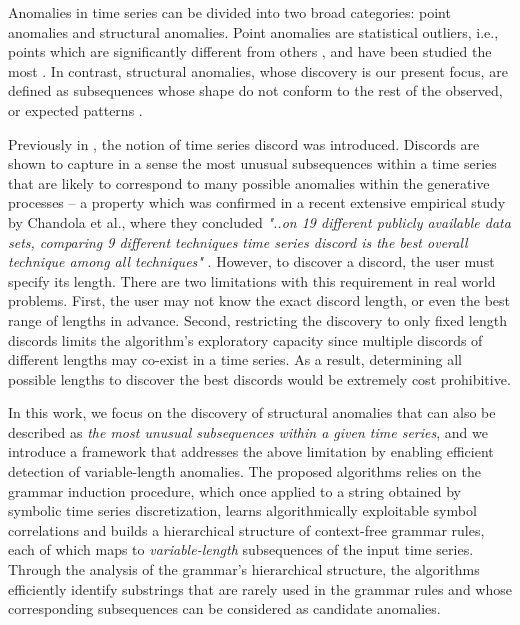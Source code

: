 \documentclass{sig-alternate}
\begin{document}
Anomalies in time series can be divided into two broad categories: point anomalies and structural anomalies. Point anomalies are statistical outliers, i.e., points which are significantly different from others \cite{hawkins}, and have been studied the most \cite{chan_anomaly}. In contrast, structural anomalies, whose discovery is our present focus, are defined as subsequences whose shape do not conform to the rest of the observed, or expected patterns \cite{outliers_survey, chan_anomaly, hot_sax}. 

Previously in \cite{hot_sax}, the notion of time series discord was introduced. Discords are shown to capture in a sense the most unusual subsequences within a time series that are likely to correspond to many possible anomalies within the generative processes -- a property which was confirmed in a recent extensive empirical study by Chandola et al., where they concluded \textit{"..on 19 different publicly available data sets, comparing 9 different techniques time series discord is the best overall technique among all techniques"} \cite{chan_anomaly}. However, to discover a discord, the user must specify its length. There are two limitations with this requirement in real world problems. First, the user may not know the exact discord length, or even the best range of lengths in advance. Second, restricting the discovery to only fixed length discords limits the algorithm's exploratory capacity since multiple discords of different lengths may co-exist in a time series. As a result, determining all possible lengths to discover the best discords would be extremely cost prohibitive.

In this work, we focus on the discovery of structural anomalies that can also be described as \textit{the most unusual subsequences within a given time series}, and we introduce a framework that addresses the above limitation by enabling efficient detection of variable-length anomalies. The proposed algorithms relies on the grammar induction procedure, which once applied to a string obtained by symbolic time series discretization, learns algorithmically exploitable symbol correlations and builds a hierarchical structure of context-free grammar rules, each of which maps to \textit{variable-length} subsequences of the input time series. Through the analysis of the grammar's hierarchical structure, the algorithms efficiently identify substrings that are rarely used in the grammar rules and whose corresponding subsequences can be considered as candidate anomalies. 
\end{document}
